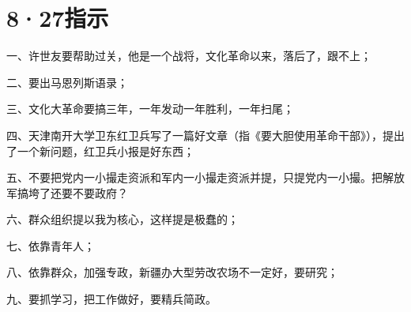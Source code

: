 \section[8·27指示（一九六七年八月二十七日）]{8·27指示}


一、许世友要帮助过关，他是一个战将，文化革命以来，落后了，跟不上；

二、要出马恩列斯语录；

三、文化大革命要搞三年，一年发动一年胜利，一年扫尾；

四、天津南开大学卫东红卫兵写了一篇好文章（指《要大胆使用革命干部》），提出了一个新问题，红卫兵小报是好东西；

五、不要把党内一小撮走资派和军内一小撮走资派并提，只提党内一小撮。把解放军搞垮了还要不要政府？

六、群众组织提以我为核心，这样提是极蠢的；

七、依靠青年人；

八、依靠群众，加强专政，新疆办大型劳改农场不一定好，要研究；

九、要抓学习，把工作做好，要精兵简政。

